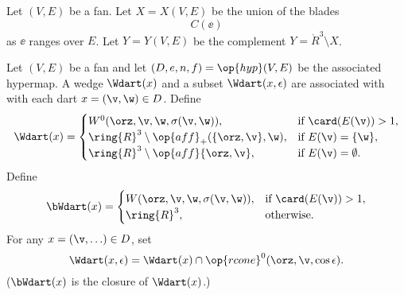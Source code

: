 \begin{definition}[X,~Y]\label{def:XY}
Let $(V,E)$ be a fan.  Let $X=X(V,E)$ be the union of the
blades
\begin{displaymath}C(\ee)\end{displaymath}
as $\ee$ ranges over $E$.  Let $Y=Y(V,E)$ be the complement
$Y = \ring{R}^3\setminus X$.
%
%
\end{definition}

\begin{definition}[$\Wdart$,~$\bWdart$]
Let $(V,E)$ be a fan and let $(D,e,n,f) = \op{hyp}(V,E)$
be the associated hypermap.  
A wedge $\Wdart(x)$ and a subset $\Wdart(x,\epsilon)$ are associated with
with each dart $x=(\v,\w)\in D$.  Define 
%
%
%
%
%
%
%
%
%
\begin{displaymath}
\Wdart(x)=
\begin{cases} 
W^0(\orz,\v,\w,\sigma(\v,\w)),&\text{if }\card(E(\v))>1,\\
\ring{R}^3\setminus \op{aff}_+(\{\orz,\v\},\w),&\text{if } E(\v) = \{\w\},\\
\ring{R}^3\setminus \op{aff}\{\orz,\v\},&\text{if } E(\v) = \emptyset.\\
\end{cases}
\end{displaymath}
Define
\begin{displaymath}
\bWdart(x) = 
\begin{cases} 
W(\orz,\v,\w,\sigma(\v,\w)),&\text{if }\card(E(\v))>1,\\
\ring{R}^3,&\text{otherwise}.\\
\end{cases}
\end{displaymath}
For any $x = (\v,\ldots)\in D$, set
\begin{displaymath}
\Wdart(x,\epsilon) = \Wdart(x) \cap \op{rcone}^0(\orz,\v,\cos\epsilon).
\end{displaymath}
%
($\bWdart(x)$ is the closure of $\Wdart(x)$.)
\end{definition}


